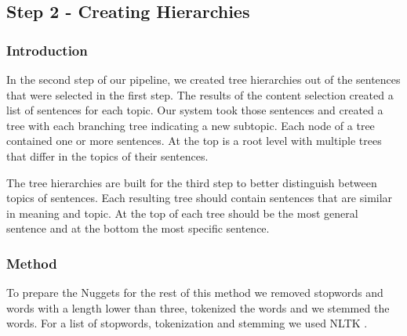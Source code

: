 



\subsection{Step 2 - Creating Hierarchies}

\subsubsection{Introduction}

In the second step of our pipeline, we created tree hierarchies out of the sentences that were selected in the first step. The results of the content selection created a list of sentences for each topic. Our system took those sentences and created a tree with each branching tree indicating a new subtopic. Each node of a tree contained one or more sentences. At the top is a root level with multiple trees that differ in the topics of their sentences. 

The tree hierarchies are built for the third step to better distinguish between topics of sentences. Each resulting tree should contain sentences that are similar in meaning and topic. At the top of each tree should be the most general sentence and at the bottom the most specific sentence.


\subsubsection{Method}

To prepare the Nuggets for the rest of this method we removed stopwords and words with a length lower than three, tokenized the words and we stemmed the words. For a list of stopwords, tokenization and stemming we used NLTK \citep{nltk}.

